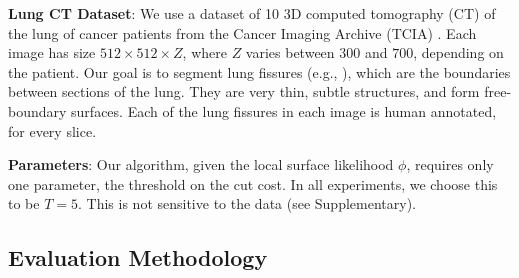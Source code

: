 \documentclass[10pt,journal,compsoc]{IEEEtran}
\begin{document}
{\bf Lung CT Dataset}: We use a dataset of 10 3D computed tomography
(CT) of the lung of cancer patients from the Cancer Imaging Archive
(TCIA) \cite{hugo2016}. Each image has size $512\times 512 \times Z$,
where $Z$ varies between $300$ and $700$, depending on the
patient. Our goal is to segment lung fissures (e.g.,
\cite{lassen2013automatic,xiao2016pulmonary}), which are the
boundaries between sections of the lung. They are very thin, subtle
structures, and form free-boundary surfaces. Each of the lung fissures
in each image is human annotated, for every slice.



{\bf Parameters}: Our algorithm, given the local surface likelihood
$\phi$, requires only one parameter, the threshold on the cut cost. In
all experiments, we choose this to be $T=5$. This is not sensitive to
the data (see Supplementary).



\subsection{Evaluation Methodology}
\end{document}
